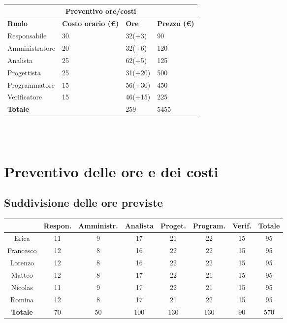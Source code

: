 \documentclass[a4paper, 12pt]{article}
\begin{document}
\begin{center}
	\begin{tabularx}{\textwidth}{|X|X|X|X|}
		\hline
		\multicolumn{4}{|c|}{\textbf{Preventivo ore/costi}}                                      \\
		\hline
		\hline
		\textbf{Ruolo}  & \textbf{Costo orario (\euro)} & \textbf{Ore} & \textbf{Prezzo (\euro)} \\
		\hline
		Responsabile    & 30                            & 32(+3)       & 90                      \\
		\hline
		Amministratore  & 20                            & 32(+6)       & 120                      \\
		\hline
		Analista        & 25                            & 62(+5)       & 125                       \\
		\hline
		Progettista     & 25                            & 31(+20)       & 500                      \\
		\hline
		Programmatore   & 15                            & 56(+30)       & 450                      \\
		\hline
		Verificatore    & 15                            & 46(+15)       & 225                      \\
		\hline
		\hline
		\textbf{Totale} &                               & 259          & 5455                    \\
		\hline
	\end{tabularx}\\[8pt]
	\mbox{}\\
\end{center}

\newpage

\section{Preventivo delle ore e dei costi}

\subsection{Suddivisione delle ore previste}

\begin{tabular}{|c|c|c|c|c|c|c|c|}
    \hline
    \textbf{} & \textbf{Respon.} & \textbf{Amministr.} & \textbf{Analista} & \textbf{Proget.} & \textbf{Program.} & \textbf{Verif.} & \textbf{Totale}\\
    \hline
    Erica & 11 & 9 & 17 & 21 & 22 & 15 & 95\\
    \hline
    Francesco & 12 & 8 & 16 & 22 & 22 & 15 & 95\\
    \hline
    Lorenzo & 12 & 8 & 16 & 22 & 22 & 15 & 95\\
    \hline
    Matteo & 12 & 8 & 17 & 22 & 21 & 15 & 95\\
    \hline
    Nicolas & 11 & 9 & 17 & 22 & 21 & 15 & 95\\
    \hline
    Romina & 12 & 8 & 17 & 21 & 22 & 15 & 95\\
    \hline
    \textbf{Totale} & 70 & 50 & 100 & 130 & 130 & 90 & 570\\
    \hline
\end{tabular}\\[8pt]
\end{document}
